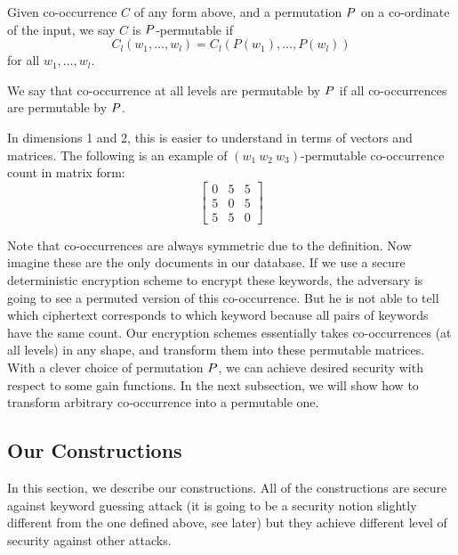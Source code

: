 \begin{definition}[Permutability]
Given co-occurrence $C$ of any form above, and a permutation $P$ on a co-ordinate of the input, we say $C$ is $P$-permutable if
\begin{equation}
	C_l(w_1, \dots, w_l) = C_l(P(w_1), \dots, P(w_l))
\end{equation}
for all $w_1, \dots, w_l$.

We say that co-occurrence at all levels are permutable by $P$ if all co-occurrences are permutable by $P$.
\end{definition}

In dimensions 1 and 2, this is easier to understand in terms of vectors and matrices. The following is an example of $(w_1\ w_2\ w_3)$-permutable co-occurrence count in matrix form:
\begin{equation}
\begin{bmatrix}0 & 5 & 5 \\5 & 0 & 5 \\ 5 & 5 & 0\end{bmatrix}
\end{equation}

Note that co-occurrences are always symmetric due to the definition. Now imagine these are the only documents in our database. If we use a secure deterministic encryption scheme to encrypt these keywords, the adversary is going to see a permuted version of this co-occurrence. But he is not able to tell which ciphertext corresponds to which keyword because all pairs of keywords have the same count. Our encryption schemes essentially takes co-occurrences (at all levels) in any shape, and transform them into these permutable matrices. With a clever choice of permutation $P$, we can achieve desired security with respect to some gain functions. In the next subsection, we will show how to transform arbitrary co-occurrence into a permutable one.




\subsection{Our Constructions}
In this section, we describe our constructions. All of the constructions are secure against keyword guessing attack (it is going to be a security notion slightly different from the one defined above, see later) but they achieve different level of security against other attacks.


